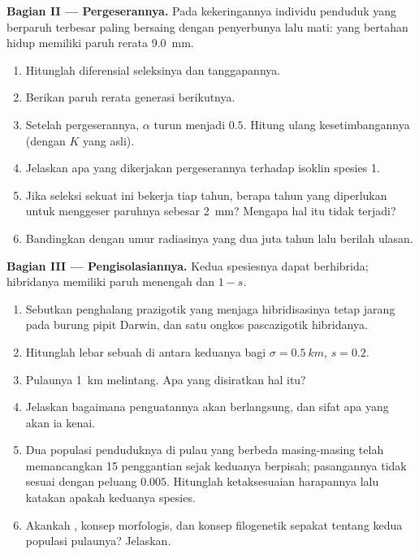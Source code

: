 \begin{problem}
\medskip
\noindent\textbf{Bagian II --- Pergeserannya.}
Pada kekeringannya individu penduduk yang berparuh terbesar paling
bersaing dengan penyerbunya lalu mati: yang bertahan hidup memiliki
paruh rerata \qty{9.0}{mm}.
\begin{enumerate}[resume]
  \item Hitunglah diferensial seleksinya dan tanggapannya.
  \item Berikan paruh rerata generasi berikutnya.
  \item Setelah pergeserannya, $\alpha$ turun menjadi $0.5$. Hitung
        ulang kesetimbangannya (dengan $K$ yang asli).
  \item Jelaskan apa yang dikerjakan pergeserannya terhadap isoklin
        spesies 1.
  \item Jika seleksi sekuat ini bekerja tiap tahun, berapa tahun yang
        diperlukan untuk menggeser paruhnya sebesar \qty{2}{mm}?
        Mengapa hal itu tidak terjadi?
  \item Bandingkan dengan umur radiasinya yang dua juta tahun lalu
        berilah ulasan.
\end{enumerate}

\medskip
\noindent\textbf{Bagian III --- Pengisolasiannya.}
Kedua spesiesnya dapat berhibrida; hibridanya memiliki paruh menengah
dan  $1 - s$.
\begin{enumerate}[resume]
  \item Sebutkan penghalang prazigotik yang menjaga hibridisasinya
        tetap jarang pada burung pipit Darwin, dan satu ongkos
        pascazigotik hibridanya.
  \item Hitunglah lebar sebuah  di antara keduanya bagi $\sigma
        = \qty{0.5}{km}$, $s = 0.2$.
  \item Pulaunya \qty{1}{km} melintang. Apa yang disiratkan hal itu?
  \item Jelaskan bagaimana penguatannya akan berlangsung, dan sifat apa
        yang akan ia kenai.
  \item Dua populasi penduduknya di pulau yang berbeda masing-masing
        telah memancangkan 15 penggantian sejak keduanya berpisah;
        pasangannya tidak sesuai dengan peluang $0.005$. Hitunglah
        ketaksesuaian harapannya lalu katakan apakah keduanya spesies.
  \item Akankah , konsep morfologis, dan konsep
        filogenetik sepakat tentang kedua populasi pulaunya? Jelaskan.
\end{enumerate}


\end{problem}
